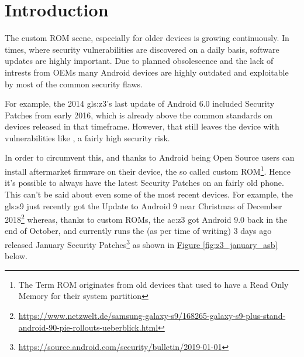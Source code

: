 
\section{Introduction}
\label{ch:Introduction}

The custom ROM scene, especially for older devices is growing continuously. In times, where security vulnerabilities are discovered on a daily basis, software updates are highly important. Due to planned obsolescence and the lack of intrests from OEMs many Android devices are highly outdated and exploitable by most of the common security flaws.

For example, the 2014 \gls{gls:z3}'s last update of Android 6.0 included Security Patches from early 2016, which is already above the common standards on devices released in that timeframe.
However, that still leaves the device with vulnerabilities like , a fairly high security risk.

In order to circumvent this, and thanks to Android being Open Source users can install aftermarket firmware on their device, the so called custom ROM\footnote{The Term ROM originates from old devices that used to have a Read Only Memory for their system partition}. Hence it's possible to always have the latest Security Patches on an fairly old phone. This can't be said about even some of the most recent devices. For example, the \gls{gls:s9} just recently got the Update to Android 9 near Christmas of December 2018\footnote{\url{https://www.netzwelt.de/samsung-galaxy-s9/168265-galaxy-s9-plus-stand-android-90-pie-rollouts-ueberblick.html}} whereas, thanks to custom ROMs, the \acrshort{ac:z3} got Android 9.0 back in the end of October, and currently runs the (as per time of writing) 3 days ago released January Security Patches\footnote{\label{jan_asb}\url{https://source.android.com/security/bulletin/2019-01-01}} as shown in \hyperref[fig:z3_january_asb]{Figure \ref{fig:z3_january_asb}} below.

\newpage

